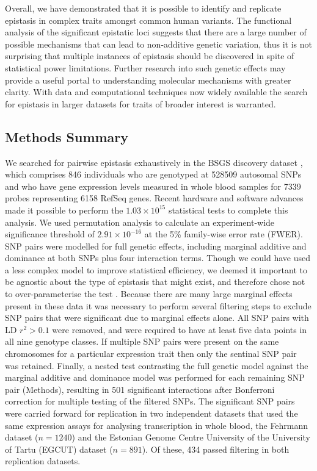 \documentclass{article}
\begin{document}
Overall, we have demonstrated that it is possible to identify and replicate epistasis in complex traits amongst common human variants. The functional analysis of the significant epistatic loci suggests that there are a large number of possible mechanisms that can lead to non-additive genetic variation, thus it is not surprising that multiple instances of epistasis should be discovered in spite of statistical power limitations. Further research into such genetic effects may provide a useful portal to understanding molecular mechanisms with greater clarity. With data and computational techniques now widely available the search for epistasis in larger datasets for traits of broader interest is warranted.


\subsection{Methods Summary}
We searched for pairwise epistasis exhaustively in the BSGS discovery dataset \cite{Powell2012}, which comprises 846 individuals who are genotyped at 528509 autosomal SNPs and who have gene expression levels measured in whole blood samples for 7339 probes representing 6158 RefSeq genes. Recent hardware and software \cite{Hemani2011} advances made it possible to perform the $1.03 \times 10^{15}$ statistical tests to complete this analysis. We used permutation analysis \cite{Churchill1994a} to calculate an experiment-wide significance threshold of $2.91 \times 10^{-16}$ at the 5\% family-wise error rate (FWER). SNP pairs were modelled for full genetic effects, including marginal additive and dominance at both SNPs plus four interaction terms. Though we could have used a less complex model to improve statistical efficiency, we deemed it important to be agnostic about the type of epistasis that might exist, and therefore chose not to over-parameterise the test \cite{Marchini2005, Hemani2013}. Because there are many large marginal effects present in these data it was necessary to perform several filtering steps to exclude SNP pairs that were significant due to marginal effects alone. All SNP pairs with LD $r^2 > 0.1$ were removed, and were required to have at least five data points in all nine genotype classes. If multiple SNP pairs were present on the same chromosomes for a particular expression trait then only the sentinal SNP pair was retained. Finally, a nested test contrasting the full genetic model against the marginal additive and dominance model was performed for each remaining SNP pair (Methods), resulting in 501 significant interactions after Bonferroni correction for multiple testing of the filtered SNPs. The significant SNP pairs were carried forward for replication in two independent datasets that used the same expression assays for analysing transcription in whole blood, the Fehrmann dataset \cite{Fehrmann2011} ($n=1240$) and the Estonian Genome Centre University of the University of Tartu (EGCUT) dataset \cite{Metspalu2004} ($n=891$). Of these, 434 passed filtering in both replication datasets.
\end{document}
